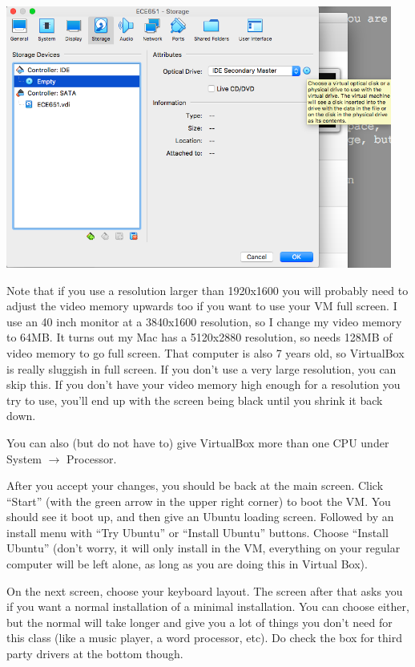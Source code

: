 \documentclass[12pt]{article}
\begin{document}
\begin{center}
  \includegraphics[width=5.0in]{vbox4.png}
\end{center}


Note that if you use a resolution larger than 1920x1600 you will probably
need to adjust the video memory upwards too if you want to use your VM
full screen.  I use an 40 inch monitor at a 3840x1600 resolution, so I change
my video memory to 64MB.  It turns out my Mac has a 5120x2880 resolution, so
needs 128MB of video memory to go full screen.  That computer is also 7 years old,
so VirtualBox is really sluggish in full screen. If you don't use a very large resolution, you
can skip this.  If you don't have your video memory high enough for a resolution
you try to use, you'll end up with the screen being black until you shrink it back down.

You can also (but do not have to) give VirtualBox more than one CPU
under System $\rightarrow$ Processor. 

After you accept your changes, you should be back at the main screen.
Click ``Start'' (with the green arrow in the upper right corner) to
boot the VM.  You should see it boot up, and then give an Ubuntu
loading screen.  Followed by an install menu with ``Try Ubuntu'' or
``Install Ubuntu'' buttons.  Choose ``Install Ubuntu'' (don't worry,
it will only install in the VM, everything on your regular computer
will be left alone, as long as you are doing this in Virtual Box).

On the next screen, choose your keyboard layout.  The screen after
that asks you if you want a normal installation of a minimal
installation.  You can choose either, but the normal will take longer
and give you a lot of things you don't need for this class (like a
music player, a word processor, etc).  Do check the box for third
party drivers at the bottom though.
\end{document}
